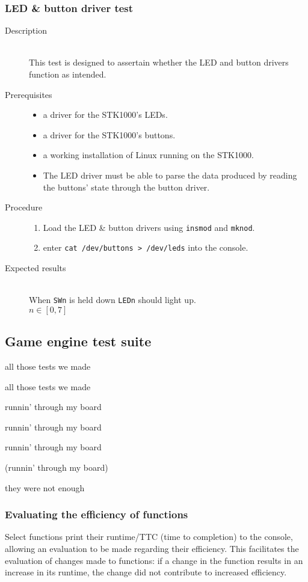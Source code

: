 	\subsubsection{LED \& button driver test}
		\begin{description}
			\item[Description] \hfill \\
				This test is designed to assertain whether the LED and button drivers function as intended.
			\item[Prerequisites] \hfill
				\begin{itemize}
					\item{a driver for the STK1000's LEDs.}
					\item{a driver for the STK1000's buttons.}
					\item{a working installation of Linux running on the STK1000.}
					\item{The LED driver must be able to parse the data produced by reading the buttons' state through the button driver.}
				\end{itemize}
			\item[Procedure] \hfill
				\begin{enumerate}
					\item{Load the LED \& button drivers using \texttt{insmod} and \texttt{mknod}.}
					\item{enter \texttt{cat /dev/buttons > /dev/leds} into the console.}
				\end{enumerate}
			\item[Expected results] \hfill \\
				When \texttt{SWn} is held down \texttt{LEDn} should light up.
				\\$n \in [0,7]$
		\end{description}	

\subsection{Game engine test suite}
	all those tests we made

	all those tests we made

	runnin' through my board

	runnin' through my board

	runnin' through my board

	(runnin' through my board)

	they were not enough
	\subsubsection{Evaluating the efficiency of functions}
		Select functions print their runtime/TTC (time to completion) to the console, allowing an evaluation to be made regarding their efficiency.
		This facilitates the evaluation of changes made to functions: if a change in the function results in an increase in its runtime, the change did not contribute to increased efficiency.

